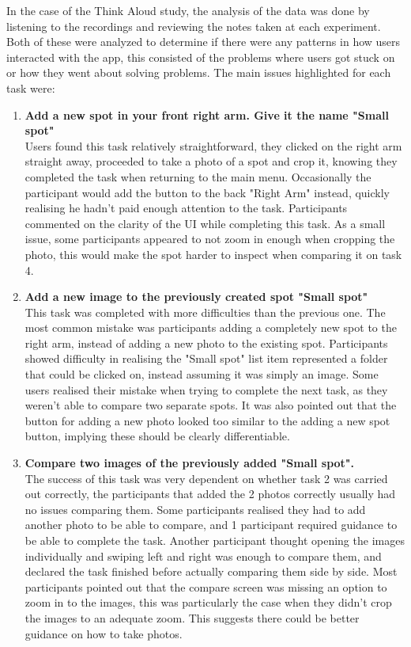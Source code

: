 In the case of the Think Aloud study, the analysis of the data was done by listening to the recordings and reviewing the notes taken at each experiment. Both of these were analyzed to determine if there were any patterns in how users interacted with the app, this consisted of the problems where users got stuck on or how they went about solving problems. The main issues highlighted for each task were:
\begin{enumerate}
    \item \textbf{Add a new spot in your front right arm. Give it the name "Small spot"}
    \\ Users found this task relatively straightforward, they clicked on the right arm straight away, proceeded to take a photo of a spot and crop it, knowing they completed the task when returning to the main menu. Occasionally the participant would add the button to the back "Right Arm" instead, quickly realising he hadn't paid enough attention to the task. Participants commented on the clarity of the UI while completing this task. As a small issue, some participants appeared to not zoom in enough when cropping the photo, this would make the spot harder to inspect when comparing it on task 4.
    \item \textbf{Add a new image to the previously created spot "Small spot"}
    \\ This task was completed with more difficulties than the previous one. The most common mistake was participants adding a completely new spot to the right arm, instead of adding a new photo to the existing spot. Participants showed difficulty in realising the "Small spot" list item represented a folder that could be clicked on, instead assuming it was simply an image. Some users realised their mistake when trying to complete the next task, as they weren't able to compare two separate spots. It was also pointed out that the button for adding a new photo looked too similar to the adding a new spot button, implying these should be clearly differentiable.
    \item \textbf{Compare two images of the previously added "Small spot".}
    \\ The success of this task was very dependent on whether task 2 was carried out correctly, the participants that added the 2 photos correctly usually had no issues comparing them. Some participants realised they had to add another photo to be able to compare, and 1 participant required guidance to be able to complete the task. Another participant thought opening the images individually and swiping left and right was enough to compare them, and declared the task finished before actually comparing them side by side. Most participants pointed out that the compare screen was missing an option to zoom in to the images, this was particularly the case when they didn't crop the images to an adequate zoom. This suggests there could be better guidance on how to take photos. 

\end{enumerate}
